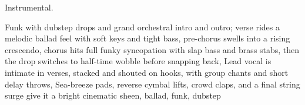
\begin{notes}
Instrumental.
\end{notes}
\begin{prompt}
Funk with dubstep drops and grand orchestral intro and outro; verse rides a melodic ballad feel with soft keys and tight bass, pre-chorus swells into a rising crescendo, chorus hits full funky syncopation with slap bass and brass stabs, then the drop switches to half-time wobble before snapping back, Lead vocal is intimate in verses, stacked and shouted on hooks, with group chants and short delay throws, Sea-breeze pads, reverse cymbal lifts, crowd claps, and a final string surge give it a bright cinematic sheen, ballad, funk, dubstep
\end{prompt}

